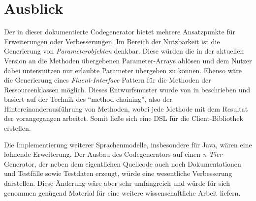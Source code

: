 \section{Ausblick}
\label{sec:prospect}

Der in dieser \thesisDesignator{} dokumentierte Codegenerator bietet mehrere Ansatzpunkte für Erweiterungen oder Verbesserungen. Im Bereich der Nutzbarkeit ist die Generierung von \emph{Parameterobjekten} denkbar. Diese würden die in der aktuellen Version an die Methoden übergebenen Parameter-Arrays ablösen und dem Nutzer dabei unterstützen nur erlaubte Parameter übergeben zu können. Ebenso wäre die Generierung eines \emph{Fluent-Interface} Pattern für die Methoden der Ressourcenklassen möglich. Dieses Entwurfsmuster wurde von \citeauthor{fowler2010domain} in \cite{fowler2010domain} beschrieben und basiert auf der Technik des \enquote{method-chaining}, also der Hintereinanderausführung von Methoden, wobei jede Methode mit dem Resultat der vorangegangen arbeitet. Somit ließe sich eine \gls{DSL} für die Client-Bibliothek erstellen.

Die Implementierung weiterer Sprachenmodelle, insbesondere für Java, wären eine lohnende Erweiterung. Der Ausbau des Codegenerators auf einen \emph{n-Tier} Generator, der neben dem eigentlichen Quellcode auch noch Dokumentationen und Testfälle sowie Testdaten erzeugt, würde eine wesentliche Verbesserung darstellen. Diese Änderung wäre aber sehr umfangreich und würde für sich genommen genügend Material für eine weitere wissenschaftliche Arbeit liefern.
